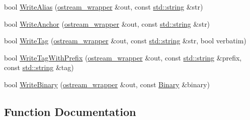 \begin{DoxyCompactItemize}
\item 
bool \mbox{\hyperlink{namespace_y_a_m_l_1_1_utils_a7073e23b2ae04bf248abd3c6fd26a90a}{Write\+Alias}} (\mbox{\hyperlink{class_y_a_m_l_1_1ostream__wrapper}{ostream\+\_\+wrapper}} \&out, const \mbox{\hyperlink{glad_8h_ac83513893df92266f79a515488701770}{std\+::string}} \&str)
\item 
bool \mbox{\hyperlink{namespace_y_a_m_l_1_1_utils_afa8f13a74dea4476312947c484d56220}{Write\+Anchor}} (\mbox{\hyperlink{class_y_a_m_l_1_1ostream__wrapper}{ostream\+\_\+wrapper}} \&out, const \mbox{\hyperlink{glad_8h_ac83513893df92266f79a515488701770}{std\+::string}} \&str)
\item 
bool \mbox{\hyperlink{namespace_y_a_m_l_1_1_utils_a7fde5352b7c504e255770937b71e9318}{Write\+Tag}} (\mbox{\hyperlink{class_y_a_m_l_1_1ostream__wrapper}{ostream\+\_\+wrapper}} \&out, const \mbox{\hyperlink{glad_8h_ac83513893df92266f79a515488701770}{std\+::string}} \&str, bool verbatim)
\item 
bool \mbox{\hyperlink{namespace_y_a_m_l_1_1_utils_a18ff3f00faf332edd6ecb7d3aa968b52}{Write\+Tag\+With\+Prefix}} (\mbox{\hyperlink{class_y_a_m_l_1_1ostream__wrapper}{ostream\+\_\+wrapper}} \&out, const \mbox{\hyperlink{glad_8h_ac83513893df92266f79a515488701770}{std\+::string}} \&prefix, const \mbox{\hyperlink{glad_8h_ac83513893df92266f79a515488701770}{std\+::string}} \&tag)
\item 
bool \mbox{\hyperlink{namespace_y_a_m_l_1_1_utils_a545fdb750b68169d5cb818cd4eedde21}{Write\+Binary}} (\mbox{\hyperlink{class_y_a_m_l_1_1ostream__wrapper}{ostream\+\_\+wrapper}} \&out, const \mbox{\hyperlink{class_y_a_m_l_1_1_binary}{Binary}} \&binary)
\end{DoxyCompactItemize}


\subsection{Function Documentation}
\mbox{\label{namespace_y_a_m_l_1_1_utils_a5e90407fae0bc69c37ab45c2c5ef1b75}} 
